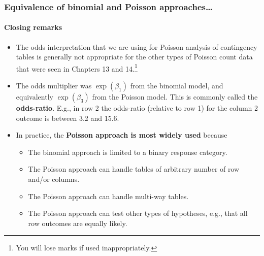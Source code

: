 \documentclass{beamer}\usepackage[]{graphicx}\usepackage[]{xcolor}
\begin{document}
\begin{frame}[fragile]
\frametitle{Equivalence of binomial and Poisson approaches\ldots}
\framesubtitle{Closing remarks}
\begin{itemize}
  \item The odds interpretation that we are using for Poisson analysis of contingency tables is generally not appropriate for the other types of Poisson count data that were seen in Chapters 13 and 14.\footnote{You will lose marks if used inappropriately.} \medskip
  
  \item The odds multiplier was $\exp(\beta_1)$ from the binomial model, and equivalently $\exp(\beta_3)$ from the Poisson model. This is commonly called the  {\bf odds-ratio}. E.g., in row 2 the odds-ratio (relative to row 1) for the column 2 outcome is between 3.2 and 15.6. \medskip
  
  \item In practice, the {\bf Poisson approach is most widely used} because
  \begin{itemize}
    \item The binomial approach is limited to a binary response category.
    \item The Poisson approach can handle tables of arbitrary number of row and/or columns.
    \item The Poisson approach can handle multi-way tables.
    \item The Poisson approach can test other types of hypotheses, e.g., that all row outcomes are equally likely.
  \end{itemize}
\end{itemize}
\end{frame}



\end{document}
